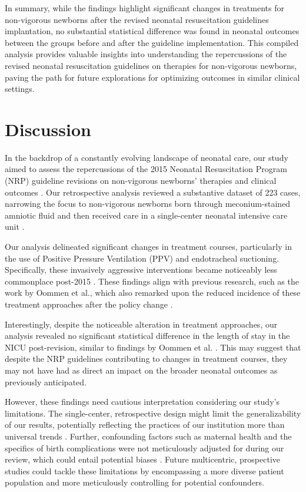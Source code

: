 \documentclass[11pt]{article}
\begin{document}
In summary, while the findings highlight significant changes in treatments for non-vigorous newborns after the revised neonatal resuscitation guidelines implantation, no substantial statistical difference was found in neonatal outcomes between the groups before and after the guideline implementation. This compiled analysis provides valuable insights into understanding the repercussions of the revised neonatal resuscitation guidelines on therapies for non-vigorous newborns, paving the path for future explorations for optimizing outcomes in similar clinical settings.

\section*{Discussion}

In the backdrop of a constantly evolving landscape of neonatal care, our study aimed to assess the repercussions of the 2015 Neonatal Resuscitation Program (NRP) guideline revisions on non-vigorous newborns' therapies and clinical outcomes \cite{Chawla2020PerinatalNeonatalMO, Wyckoff2015Part1N}. Our retrospective analysis reviewed a substantive dataset of 223 cases, narrowing the focus to non-vigorous newborns born through meconium-stained amniotic fluid and then received care in a single-center neonatal intensive care unit \cite{Rahman2019IdentificationON, Mileder2021TelesimulationAA}. 

Our analysis delineated significant changes in treatment courses, particularly in the use of Positive Pressure Ventilation (PPV) and endotracheal suctioning. Specifically, these invasively aggressive interventions became noticeably less commonplace post-2015 \cite{Oommen2020ResuscitationON, Myers2020ImpactOT, Thayyil2010CerebralMR, Munns2016GlobalCR}. These findings align with previous research, such as the work by Oommen et al., which also remarked upon the reduced incidence of these treatment approaches after the policy change \cite{Oommen2020ResuscitationON}. 

Interestingly, despite the noticeable alteration in treatment approaches, our analysis revealed no significant statistical difference in the length of stay in the NICU post-revision, similar to findings by Oommen et al. \cite{Oommen2020ResuscitationON, Myers2020ImpactOT}. This may suggest that despite the NRP guidelines contributing to changes in treatment courses, they may not have had as direct an impact on the broader neonatal outcomes as previously anticipated. 

However, these findings need cautious interpretation considering our study's limitations. The single-center, retrospective design might limit the generalizability of our results, potentially reflecting the practices of our institution more than universal trends \cite{Eudy-Byrne2021PharmacometricDO, Eichacker2007SeparatingPG}. Further, confounding factors such as maternal health and the specifics of birth complications were not meticulously adjusted for during our review, which could entail potential biases \cite{Katsagoni2018ImprovementsIC}. Future multicentric, prospective studies could tackle these limitations by encompassing a more diverse patient population and more meticulously controlling for potential confounders.
\end{document}
